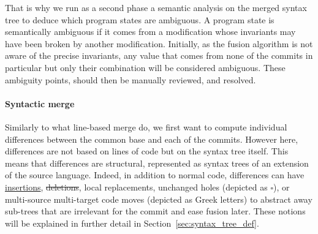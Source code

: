 \documentclass[a4paper,11pt]{article}
\newcommand\id{\square}
\newcommand\yrg[1]{}%
\newcommand\gb[1]{}%
\begin{document}
That is why we run as a second phase a semantic analysis on the merged
syntax tree to deduce which program states are ambiguous. A program
state is semantically ambiguous if it comes from a modification whose
invariants may have been broken by another modification. Initially, as
the fusion algorithm is not aware of the precise invariants, any value
that comes from none of the commits in particular but only their
combination will be considered ambiguous.  These ambiguity points,
should then be manually reviewed, and resolved.  \yrg{I think that
  this paragraph is important and could be made clearer.  You should
  try to justify a little bit more the approach and the problem it
  solves.  } \gb{J'ai réécrit une bonne partie du paragraphe pour
  essayer d'améliorer l'explication de la coupure du problème en deux
  et de l'existance de la phase de vérification sémantique.}

\paragraph{Syntactic merge}
Similarly to what line-based merge do, we first want to compute
individual differences between the common base and each of the
commits. However here, differences are not based on lines of code but
on the syntax tree itself. This means that differences are structural,
represented as syntax trees of an extension of the source
language. Indeed, in addition to normal code, differences can have
\ul{insertions}, \st{deletions}, local replacements, unchanged holes
(depicted as $\id$), or multi-source multi-target code moves (depicted
as Greek letters) to abstract away sub-trees that are irrelevant for
the commit and ease fusion later. These notions will be explained in
further detail in Section~\ref{sec:syntax_tree_def}.
\end{document}
